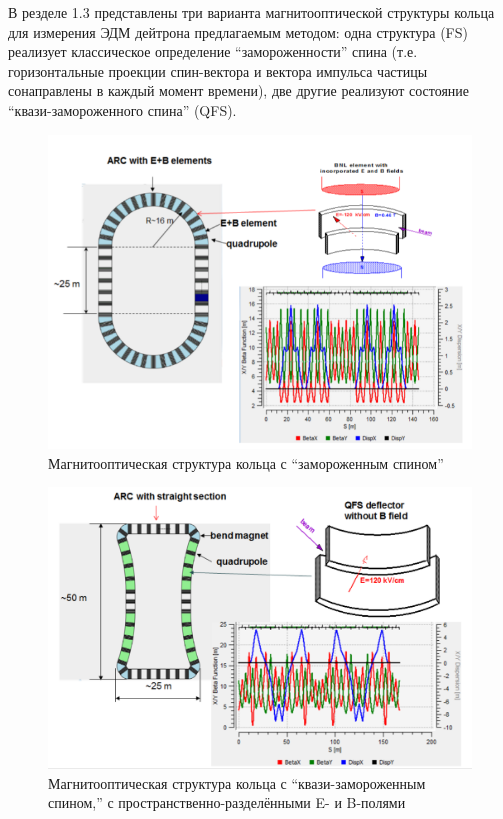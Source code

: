 В резделе 1.3 представлены три варианта магнитооптической структуры кольца 
для измерения ЭДМ дейтрона предлагаемым методом: одна структура (FS) 
реализует классическое определение ``замороженности'' спина (т.е. горизонтальные проекции 
спин-вектора и вектора импульса частицы сонаправлены в каждый момент времени),
две другие  реализуют состояние ``квази-замороженного спина'' (QFS). 

\begin{figure}[H]\centering
	\includegraphics[width=.95\linewidth]{images/chapter2/BNL_lattice}
	\caption{Магнитооптическая структура кольца с ``замороженным спином''\label{fig:lattices:FS}}
\end{figure}
\begin{figure}[H]\centering
	\includegraphics[width=.95\linewidth, trim=0 3 0 0, clip]{images/chapter2/6_3_lattice}
	\caption{Магнитооптическая структура кольца с ``квази-замороженным спином,'' 
		с пространственно-разделёнными E- и B-полями\label{fig:lattices:6_3}}
\end{figure}
